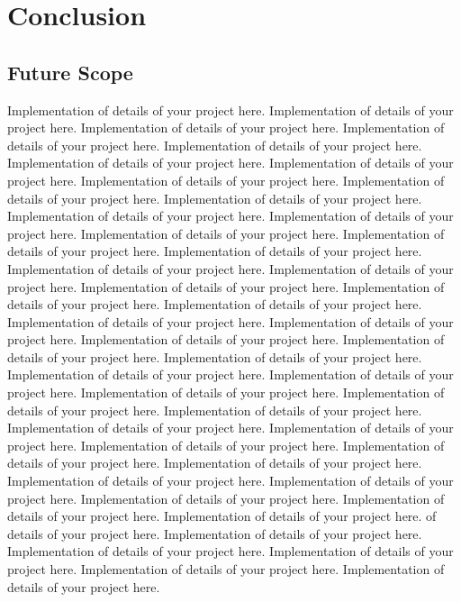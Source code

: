 \chapter{Conclusion}
\section{Future Scope}

Implementation of details of  your project here. Implementation of details of  your project here. Implementation of details of  your project here. Implementation of details of  your project here. Implementation of details of  your project here. Implementation of details of  your project here. Implementation of details of  your project here. Implementation of details of  your project here. Implementation of details of  your project here. Implementation of details of  your project here. Implementation of details of  your project here. Implementation of details of  your project here. Implementation of details of  your project here. Implementation of details of  your project here. Implementation of details of  your project here. Implementation of details of  your project here. Implementation of details of  your project here. Implementation of details of  your project here. Implementation of details of  your project here. Implementation of details of  your project here. Implementation of details of  your project here. Implementation of details of  your project here. Implementation of details of  your project here. Implementation of details of  your project here. Implementation of details of  your project here. Implementation of details of  your project here. Implementation of details of  your project here. Implementation of details of  your project here. Implementation of details of  your project here. Implementation of details of  your project here. Implementation of details of  your project here. Implementation of details of  your project here. Implementation of details of  your project here. Implementation of details of  your project here. Implementation of details of  your project here. Implementation of details of  your project here. Implementation of details of  your project here. Implementation of details of  your project here. Implementation of details of  your project here. Implementation of details of  your project here.  of details of  your project here. Implementation of details of  your project here. Implementation of details of  your project here. Implementation of details of  your project here. Implementation of details of  your project here. Implementation of details of  your project here. 




